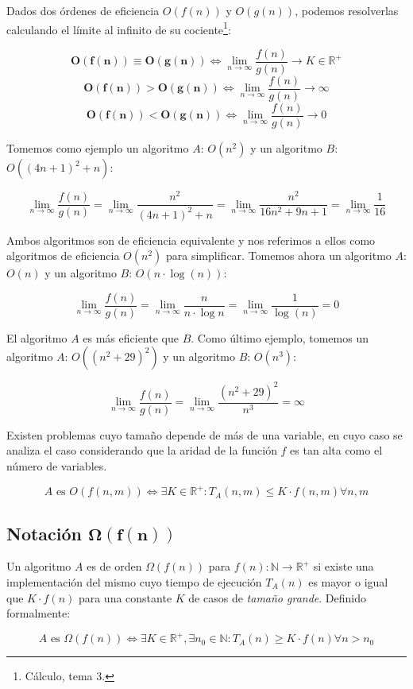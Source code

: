 Dados dos órdenes de eficiencia $O(f(n))$ y $O(g(n))$, podemos resolverlas calculando el límite al infinito de su cociente\footnote{Cálculo, tema 3.}:

\[\boldsymbol{O(f(n))\equiv O(g(n))}\Leftrightarrow\lim_{n\to\infty}\frac{f(n)}{g(n)}\rightarrow K\in\mathbb{R}^+\]
\[\boldsymbol{O(f(n))>O(g(n))}\Leftrightarrow\lim_{n\to\infty}\frac{f(n)}{g(n)}\rightarrow\infty\]
\[\boldsymbol{O(f(n))<O(g(n))}\Leftrightarrow\lim_{n\to\infty}\frac{f(n)}{g(n)}\rightarrow0\]

Tomemos como ejemplo un algoritmo $A$: $O(n^2)$ y un algoritmo $B$: $O({(4n+1)}^2+n)$:

\[\lim_{n\to\infty}\frac{f(n)}{g(n)}=\lim_{n\to\infty}\frac{n^2}{{(4n+1)}^2+n}=\lim_{n\to\infty}\frac{n^2}{16n^2+9n+1}=\lim_{n\to\infty}\frac{1}{16}\]

Ambos algoritmos son de eficiencia equivalente y nos referimos a ellos como algoritmos de eficiencia $O(n^2)$ para simplificar.
Tomemos ahora un algoritmo $A$: $O(n)$ y un algoritmo $B$: $O(n\cdot\log(n))$:

\[\lim_{n\to\infty}\frac{f(n)}{g(n)}=\lim_{n\to\infty}\frac{n}{n\cdot\log{n}}=\lim_{n\to\infty}\frac{1}{\log(n)}=0\]

El algoritmo $A$ es más eficiente que $B$.
Como último ejemplo, tomemos un algoritmo $A$: $O({(n^2+29)}^2)$ y un algoritmo $B$: $O(n^3)$:

\[\lim_{n\to\infty}\frac{f(n)}{g(n)}=\lim_{n\to\infty}\frac{{(n^2+29)}^2}{n^3}=\infty\]

Existen problemas cuyo tamaño depende de más de una variable, en cuyo caso se analiza el caso considerando que la aridad de la función $f$ es tan alta como el número de variables.

\[A\text{ es }O(f(n,m))\Leftrightarrow\exists K\in\mathbb{R}^+:T_A(n,m)\leq K\cdot f(n,m)\forall n,m\]

\subsection{Notación $\boldsymbol{\Omega(f(n))}$}

Un algoritmo $A$ es de orden $\Omega(f(n))$ para $f(n):\mathbb{N}\rightarrow\mathbb{R}^+$ si existe una implementación del mismo cuyo tiempo de ejecución $T_A(n)$ es mayor o igual que $K\cdot f(n)$ para una constante $K$ de casos de \textit{tamaño grande}.
Definido formalmente:

\[A\text{ es }\Omega(f(n))\Leftrightarrow\exists K\in\mathbb{R}^+,\exists n_0\in\mathbb{N}:T_A(n)\geq K\cdot f(n)\forall n>n_0\]

